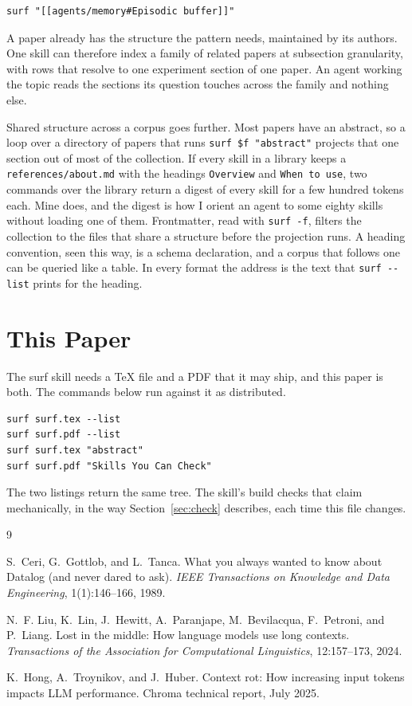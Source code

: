 \documentclass[11pt]{article}
\begin{document}
\begin{Verbatim}
surf "[[agents/memory#Episodic buffer]]"
\end{Verbatim}

A paper already has the structure the pattern needs, maintained by its authors.
One skill can therefore index a family of related papers at subsection
granularity, with rows that resolve to one experiment section of one paper. An
agent working the topic reads the sections its question touches across the
family and nothing else.

Shared structure across a corpus goes further. Most papers have an abstract, so
a loop over a directory of papers that runs \texttt{surf \$f "abstract"}
projects that one section out of most of the collection. If every skill in a
library keeps a \texttt{references/about.md} with the headings
\texttt{Overview} and \texttt{When to use}, two commands over the library return
a digest of every skill for a few hundred tokens each. Mine does, and the digest
is how I orient an agent to some eighty skills without loading one of them.
Frontmatter, read with \texttt{surf -f}, filters the collection to the files
that share a structure before the projection runs. A heading convention, seen
this way, is a schema declaration, and a corpus that follows one can be queried
like a table. In every format the address is the text that
\texttt{surf -{}-list} prints for the heading.

\section{This Paper}

The surf skill needs a TeX file and a PDF that it may ship, and this paper is
both. The commands below run against it as distributed.

\begin{Verbatim}
surf surf.tex --list
surf surf.pdf --list
surf surf.tex "abstract"
surf surf.pdf "Skills You Can Check"
\end{Verbatim}

The two listings return the same tree. The skill's build checks that claim
mechanically, in the way Section~\ref{sec:check} describes, each time this file
changes.

\begin{thebibliography}{9}

S.~Ceri, G.~Gottlob, and L.~Tanca.
What you always wanted to know about Datalog (and never dared to ask).
\emph{IEEE Transactions on Knowledge and Data Engineering}, 1(1):146--166, 1989.

N.~F. Liu, K.~Lin, J.~Hewitt, A.~Paranjape, M.~Bevilacqua, F.~Petroni, and
P.~Liang.
Lost in the middle: How language models use long contexts.
\emph{Transactions of the Association for Computational Linguistics}, 12:157--173, 2024.

K.~Hong, A.~Troynikov, and J.~Huber.
Context rot: How increasing input tokens impacts LLM performance.
Chroma technical report, July 2025.

\end{thebibliography}
\end{document}
